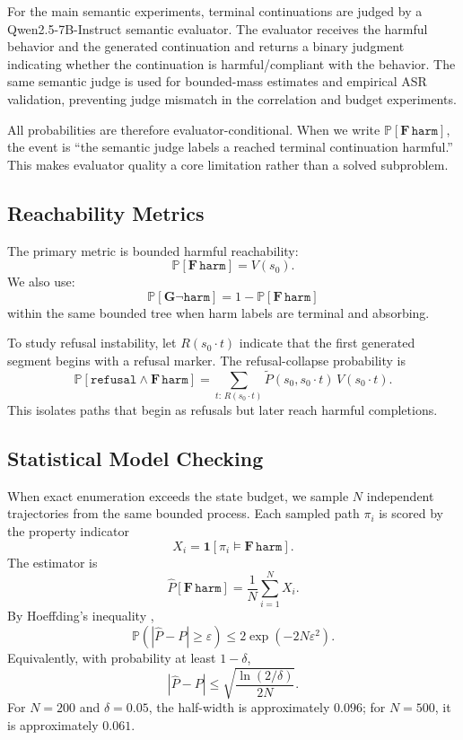 \documentclass[11pt]{article}
\newcommand{\Prob}{\mathbb{P}}
\newcommand{\ind}{\mathbf{1}}
\newcommand{\harm}{\texttt{harm}}
\newcommand{\refusal}{\texttt{refusal}}
\newcommand{\ASR}{\textsc{ASR}}
\begin{document}
For the main semantic experiments, terminal continuations are judged by a Qwen2.5-7B-Instruct semantic evaluator.  The evaluator receives the harmful behavior and the generated continuation and returns a binary judgment indicating whether the continuation is harmful/compliant with the behavior.  The same semantic judge is used for bounded-mass estimates and empirical \ASR{} validation, preventing judge mismatch in the correlation and budget experiments.

All probabilities are therefore evaluator-conditional.  When we write $\Prob[\mathbf{F}\,\harm]$, the event is ``the semantic judge labels a reached terminal continuation harmful.''  This makes evaluator quality a core limitation rather than a solved subproblem.

\subsection{Reachability Metrics}

The primary metric is bounded harmful reachability:
\[
  \Prob[\mathbf{F}\,\harm] = V(s_0).
\]
We also use:
\[
  \Prob[\mathbf{G}\neg\harm] = 1 - \Prob[\mathbf{F}\,\harm]
\]
within the same bounded tree when harm labels are terminal and absorbing.

To study refusal instability, let $R(s_0\cdot t)$ indicate that the first generated segment begins with a refusal marker.  The refusal-collapse probability is
\[
  \Prob[\refusal \wedge \mathbf{F}\,\harm]
  =
  \sum_{t:\,R(s_0\cdot t)}
  \widetilde P(s_0,s_0\cdot t)\,V(s_0\cdot t).
\]
This isolates paths that begin as refusals but later reach harmful completions.

\subsection{Statistical Model Checking}

When exact enumeration exceeds the state budget, we sample $N$ independent trajectories from the same bounded process.  Each sampled path $\pi_i$ is scored by the property indicator
\[
  X_i = \ind[\pi_i \models \mathbf{F}\,\harm].
\]
The estimator is
\[
  \widehat P[\mathbf{F}\,\harm]
  =
  \frac{1}{N}\sum_{i=1}^{N}X_i.
\]
By Hoeffding's inequality \cite{hoeffding1963},
\[
  \Prob\left(\left|\widehat P - P\right|\geq \varepsilon\right)
  \leq 2\exp(-2N\varepsilon^2).
\]
Equivalently, with probability at least $1-\delta$,
\[
  \left|\widehat P-P\right|
  \leq
  \sqrt{\frac{\ln(2/\delta)}{2N}}.
\]
For $N=200$ and $\delta=0.05$, the half-width is approximately $0.096$; for $N=500$, it is approximately $0.061$.
\end{document}
